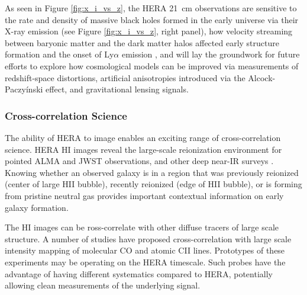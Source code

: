 \documentclass[preprint]{aastex}
\begin{document}
As seen in  Figure \ref{fig:x_i_vs_z}, the HERA 21~cm observations are sensitive to 
the rate and density of massive black holes formed in the
early universe \citep{pritchard_loeb2010} via their X-ray emission (see Figure \ref{fig:x_i_vs_z}, right panel), 
how velocity streaming between baryonic 
matter and the dark matter halos affected early structure formation and the onset
of Ly$\alpha$ emission \citep{visbal_et_al2012}, and will lay the groundwork for future
efforts to explore how 
cosmological models can be improved via measurements of redshift-space distortions,
artificial anisotropies introduced via the Alcock-Paczy\'inski effect, and
gravitational lensing signals\citep{furlanetto_et_al2006}.


\subsubsection{Cross-correlation Science}
\label{sec:CrossCorrelation}

The ability of HERA to image enables an exciting range of cross-correlation science. 
HERA HI images reveal the large-scale reionization environment for pointed ALMA and JWST 
observations, and other deep near-IR surveys \citep{lidz_et_al2009}.  
Knowing whether an observed galaxy is in a region that  was
previously reionized (center of large HII bubble), recently reionized (edge of HII bubble), or is forming from 
pristine neutral gas provides important contextual information on early galaxy formation.

The HI images can be ross-correlate with other diffuse 
tracers of large scale structure.  A number of studies have proposed cross-correlation with large scale intensity
mapping of molecular  CO \cite{lidz_et_al2011} and atomic CII \citep{gong_et_al2011} lines. 
Prototypes of these experiments 
may be operating on the HERA timescale.  Such probes have the advantage of having different systematics 
compared to HERA, potentially allowing clean measurements of the underlying signal.

\end{document}
